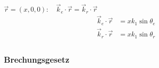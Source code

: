 $ \vec{r} = (x,0,0): \quad \vec{k}_e \cdot \vec{r} = \vec{k}_r \cdot \vec{r} $
\begin{align*}
\vec{k}_e \cdot \vec{r} &= x k_1 \sin \theta_e\\
\vec{k}_r \cdot \vec{r} &= x k_1 \sin \theta_r\\
\end{align*}
\begin{center}
	\begin{minipage}{.5\linewidth}
	\end{minipage}
\end{center}

\subsubsection{Brechungsgesetz}

